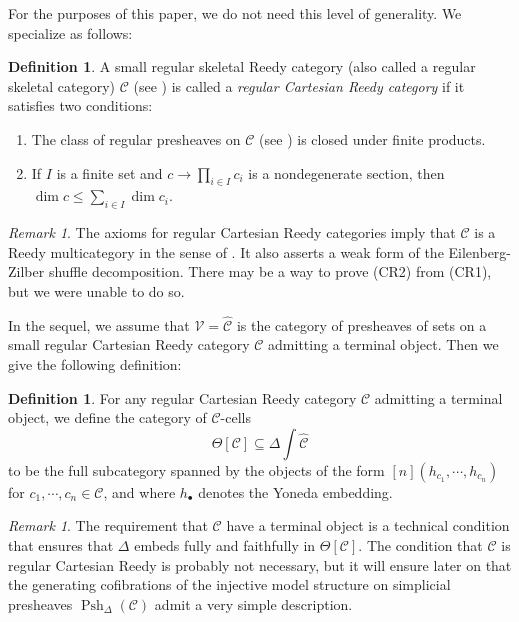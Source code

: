 \documentclass[a4paper]{article}
\numberwithin{equation}{subsection}
\theoremstyle{plain}   %
\theoremstyle{definition}
\newtheorem{defn}[equation]{Definition}
\theoremstyle{remark}
\newtheorem{rem}[equation]{Remark}
\theoremstyle{plain}
\newcommand{\psh}[1]{\ensuremath{\widehat{#1}}}
\providecommand{\C}{}
\renewcommand{\C}{\ensuremath{\mathcal{C}}}
\newcommand{\spsh}{\ensuremath{\operatorname{Psh}_\Delta(\mathcal{C})}}
\begin{document}
For the purposes of this paper, we do not need this level of generality.  We specialize as follows: 

\begin{defn}\label{cishelp}
	A small regular skeletal Reedy category (also called a regular skeletal category) \(\C\) (see ) is called a \emph{regular Cartesian Reedy category} if it satisfies two conditions:

	\begin{enumerate}[leftmargin=5em,label=(CR\arabic*{})]
		\item The class of regular presheaves on \(\C\) (see ) is closed under finite products.
		\item If \(I\) is a finite set and \(c\to \prod\limits_{i\in I }c_i \) is a nondegenerate section, then \(\dim c \leq \sum\limits_{i\in I}\dim c_i\).
	\end{enumerate}
\end{defn}

\begin{rem}
	The axioms for regular Cartesian Reedy categories imply that \(\C\) is a Reedy multicategory in the sense of \cite{bergner-rezk-reedy}.  It also asserts a weak form of the Eilenberg-Zilber shuffle decomposition. There may be a way to prove (CR2) from (CR1), but we were unable to do so.
\end{rem}

In the sequel, we assume that \(\mathcal{V}=\psh{\C}\) is the category of presheaves of sets on a small regular Cartesian Reedy category \(\C\) admitting a terminal object.  Then we give the following definition:

\begin{defn} For any regular Cartesian Reedy category \(\C\) admitting a terminal object, we define the category of \(\C\)-cells
	\[
		\Theta[\C]\subseteq \Delta \int \psh{\C}
	\]
	to be the full subcategory spanned by the objects of the form \([n](h_{c_1},\cdots, h_{c_n})\) for \(c_1,\cdots, c_n \in \C\), and where \(h_\bullet\) denotes the Yoneda embedding.
\end{defn}

\begin{rem}
	The requirement that \(\C\) have a terminal object is a technical condition that ensures that \(\Delta\) embeds fully and faithfully in \(\Theta[\C]\).  The condition that \(\C\) is regular Cartesian Reedy is probably not necessary, but it will ensure later on that the generating cofibrations of the injective model structure on simplicial presheaves \(\spsh\) admit a very simple description.
\end{rem}
\end{document}

